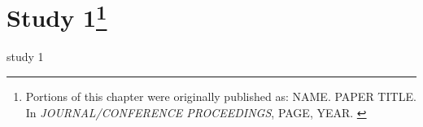 \chapter[Study 1]{Study 1\footnote{Portions of this chapter were originally published as: NAME. PAPER TITLE. In \textit{JOURNAL/CONFERENCE PROCEEDINGS}, PAGE, YEAR.  \citep{study_1} } }
\label{chapter:study_1}

study 1
